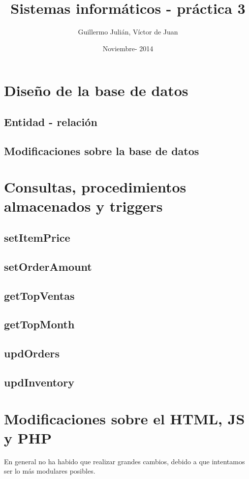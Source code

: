 \documentclass[nochap]{apuntes}
\title{Sistemas informáticos - práctica 3}
\author{Guillermo Julián, Víctor de Juan}
\date{Noviembre- 2014}
\begin{document}
\pagestyle{plain}
\maketitle

\tableofcontents
\newpage

\section{Diseño de la base de datos}
\subsection{Entidad - relación}

\subsection{Modificaciones sobre la base de datos}

\section{Consultas, procedimientos almacenados y triggers}
\subsection{setItemPrice}
\subsection{setOrderAmount}
\subsection{getTopVentas}
\subsection{getTopMonth}
\subsection{updOrders}
\subsection{updInventory}

\section{Modificaciones sobre el HTML, JS y PHP}
En general no ha habido que realizar grandes cambios, debido a que intentamos ser lo más modulares posibles.
\end{document}

